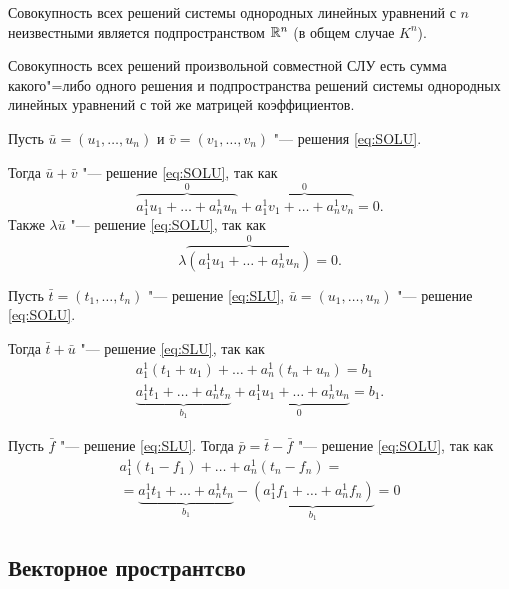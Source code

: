 \begin{theorem}
    Совокупность всех решений системы однородных линейных уравнений с $n$ неизвестными является подпространством $\mathbb{R}^n$ (в общем случае $K^n$).

    Совокупность всех решений произвольной совместной СЛУ есть сумма какого"=либо одного решения и подпространства решений системы однородных линейных уравнений с той же матрицей коэффициентов.
\end{theorem}
\begin{Proof}
    Пусть $\bar{u} = (u_1, \ldots, u_n)$ и $\bar{v} = (v_1, \ldots, v_n)$ "--- решения \ref{eq:SOLU}.

    Тогда $\bar{u} + \bar{v}$ "--- решение \ref{eq:SOLU}, так как
    \begin{equation*}
        \overbrace{a_1^1u_1 + \ldots + a_n^1u_n}^0 + \overbrace{a_1^1v_1 + \ldots + a_n^1v_n}^0 = 0.
    \end{equation*}
    Также $\lambda\bar{u}$ "--- решение \ref{eq:SOLU}, так как 
    \begin{equation*}
        \lambda\overbrace{(a_1^1u_1 + \ldots + a_n^1u_n)}^0 = 0.
    \end{equation*}

    Пусть $\bar{t} = (t_1, \ldots, t_n)$ "--- решение \ref{eq:SLU}, $\bar{u} = (u_1, \ldots, u_n)$ "--- решение \ref{eq:SOLU}.
    
    Тогда $\bar{t} + \bar{u}$ "--- решение \ref{eq:SLU}, так как
    \begin{gather*}
        a_1^1(t_1 + u_1) + \ldots + a_n^1(t_n + u_n) = b_1 \\
        \underbrace{a_1^1t_1 + \ldots + a_n^1t_n}_{b_1} + \underbrace{a_1^1u_1 + \ldots + a_n^1u_n}_0 = b_1.
    \end{gather*}

    Пусть $\bar{f}$ "--- решение \ref{eq:SLU}. Тогда $\bar{p} = \bar{t} - \bar{f}$ "--- решение \ref{eq:SOLU}, так как
    \begin{gather*}
        a_1^1(t_1 - f_1) + \ldots + a_n^1(t_n - f_n) = \\ = \underbrace{a_1^1t_1 + \ldots + a_n^1t_n}_{b_1} - \underbrace{(a_1^1f_1 + \ldots + a_n^1f_n)}_{b_1} = 0
    \end{gather*}
\end{Proof}

\subsection*{Векторное пространтсво}

